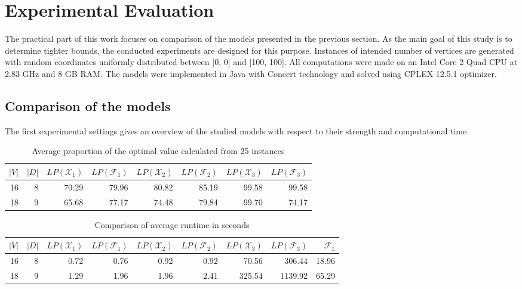 \section{Experimental Evaluation}
\label{sec:exp}

The practical part of this work focuses on comparison of the models presented in the previous section.
As the main goal of this study is to determine tighter bounds, the conducted experiments are designed for this purpose.
Instances of intended number of vertices are generated with random coordinates uniformly distributed between [0, 0] and [100, 100].
All computations were made on an Intel Core 2 Quad CPU at 2.83 GHz and 8 GB RAM.
The models were implemented in Java with Concert technology and solved using CPLEX 12.5.1 optimizer.
 
\subsection{Comparison of the models}

The first experimental settings gives an overview of the studied models with respect to their strength and computational time.

\begin{table}[h!]
\centering
\setlength{\tabcolsep}{6pt} %
\renewcommand{\arraystretch}{1.4} %
\begin{tabular}{rrrrrrrr}
$|V|$ & $|D|$ & $LP(\mathcal{X}_1)$ & $LP(\mathcal{F}_1)$ & $LP(\mathcal{X}_2)$ & $LP(\mathcal{F}_2)$ & $LP(\mathcal{X}_3)$ &$LP(\mathcal{F}_3)$\\\hline
  16 & 8       & 70.29  & 79.96  & 80.82    & 85.19    & 99.58  & 99.58\\
  18 & 9       & 65.68  & 77.17  & 74.48    & 79.84    & 99.70  & 74.17\\ 
\end{tabular}
\caption{Average proportion of the optimal value calculated from 25 instances}
\label{tab:small_inst_cost}
\end{table}

\begin{table}[h!]
\centering
\setlength{\tabcolsep}{6pt} %
\renewcommand{\arraystretch}{1.4} %
\begin{tabular}{rrrrrrrrr}
 $|V|$ & $|D|$ & $LP(\mathcal{X}_1)$ & $LP(\mathcal{F}_1)$ & $LP(\mathcal{X}_2)$ & $LP(\mathcal{F}_2)$ & $LP(\mathcal{X}_3)$ & $LP(\mathcal{F}_3)$ & $\mathcal{F}_1$\\ \hline
  16 & 8       & 0.72   & 0.76   & 0.92     & 0.92     & 70.56  & 306.44  & 18.96 \\
  18 & 9       & 1.29   & 1.96   & 1.96     & 2.41     & 325.54 & 1139.92 & 65.29\\ 
\end{tabular}
\caption{Comparison of average runtime in seconds}
\label{tab:small_inst_time}
\end{table}

